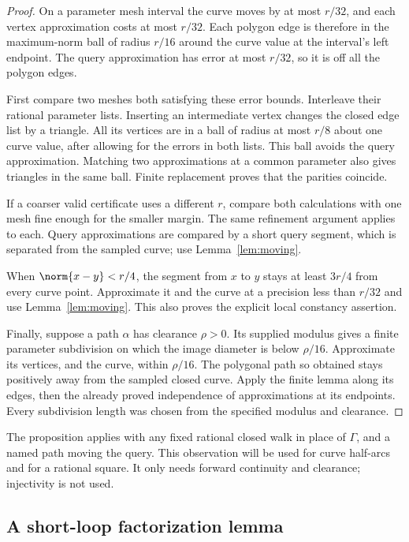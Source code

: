 \begin{proof}
On a parameter mesh interval the curve moves by at most $r/32$,
and each vertex approximation costs at most $r/32$.
Each polygon edge is therefore in the maximum-norm ball of radius
$r/16$ around the curve value at the interval's left endpoint.
The query approximation has error at most $r/32$, so it is off all
the polygon edges.

First compare two meshes both satisfying these error bounds.
Interleave their rational parameter lists. Inserting an intermediate
vertex changes the closed edge list by a triangle. All its vertices
are in a ball of radius at most $r/8$ about one curve value,
after allowing for the errors in both lists. This ball avoids the
query approximation. Matching two approximations at a common
parameter also gives triangles in the same ball. Finite replacement
proves that the parities coincide.

If a coarser valid certificate uses a different $r$, compare both
calculations with one mesh fine enough for the smaller margin.
The same refinement argument applies to each. Query approximations
are compared by a short query segment, which is separated from the
sampled curve; use Lemma~\ref{lem:moving}.

When $\norm{x-y}<r/4$, the segment from $x$ to $y$ stays at least
$3r/4$ from every curve point. Approximate it and the curve at a
precision less than $r/32$ and use Lemma~\ref{lem:moving}. This
also proves the explicit local constancy assertion.

Finally, suppose a path $\alpha$ has clearance $\rho>0$. Its supplied
modulus gives a finite parameter subdivision on which the image
diameter is below $\rho/16$. Approximate its vertices, and the curve,
within $\rho/16$. The polygonal path so obtained stays positively
away from the sampled closed curve. Apply the finite lemma along its
edges, then the already proved independence of approximations at
its endpoints. Every subdivision length was chosen from the
specified modulus and clearance.
\end{proof}

The proposition applies with any fixed rational closed walk in place
of $\Gamma$, and a named path moving the query. This observation will
be used for curve half-arcs and for a rational square. It only needs
forward continuity and clearance; injectivity is not used.

\subsection{A short-loop factorization lemma}
\label{sec:factor}

